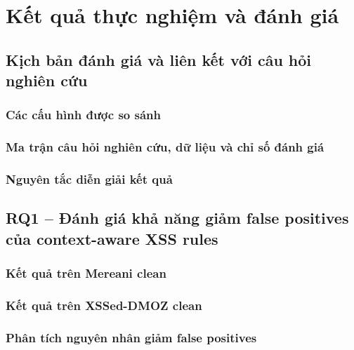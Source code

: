 \chapter{Kết quả thực nghiệm và đánh giá}
\label{chap:results}

\section{Kịch bản đánh giá và liên kết với câu hỏi nghiên cứu}
\label{sec:results-evaluation-scenarios}

\subsection{Các cấu hình được so sánh}
\label{subsec:results-comparison-configurations}

\subsection{Ma trận câu hỏi nghiên cứu, dữ liệu và chỉ số đánh giá}
\label{subsec:results-rq-dataset-metrics}

\subsection{Nguyên tắc diễn giải kết quả}
\label{subsec:results-interpretation-principles}

\section{RQ1 -- Đánh giá khả năng giảm false positives của context-aware XSS rules}
\label{sec:rq1-context-aware-xss-fp}

\subsection{Kết quả trên Mereani clean}
\label{subsec:rq1-mereani-clean-results}

\subsection{Kết quả trên XSSed-DMOZ clean}
\label{subsec:rq1-xssed-dmoz-clean-results}

\subsection{Phân tích nguyên nhân giảm false positives}
\label{subsec:rq1-fp-reduction-analysis}

